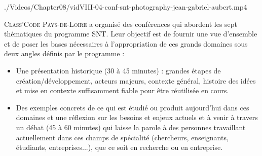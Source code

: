 
\begin{marginvideo}
		{./Videos/Chapter08/vidVIII-04-conf-snt-photography-jean-gabriel-aubert.mp4}%
\end{marginvideo}

\textsc{Class'Code} \textsc{Pays-de-Loire} a organisé des conférences qui abordent les sept thématiques du programme SNT. Leur objectif est de fournir une vue d’ensemble et de poser les bases nécessaires à l’appropriation de ces grands domaines sous deux angles définis par le programme :
\begin{itemize}
\item Une présentation historique (30 à 45 minutes) : grandes étapes de création/développement, acteurs majeurs, contexte général, histoire des idées et mise en contexte suffisamment fiable pour être réutilisée en cours.
\item Des exemples concrets de ce qui est étudié ou produit aujourd’hui dans ces domaines et une réflexion sur les besoins et enjeux actuels et à venir à travers un débat (45 à 60 minutes) qui laisse la parole à des personnes travaillant actuellement dans ces champs de spécialité  (chercheurs, enseignants, étudiants, entreprises...), que ce soit en recherche ou en entreprise.
\end{itemize}

